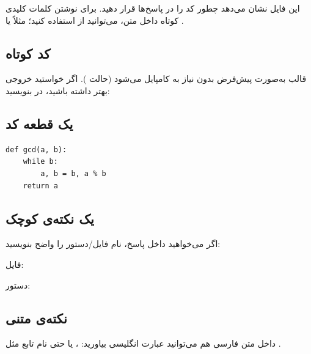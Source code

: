 
این فایل نشان می‌دهد چطور کد را در پاسخ‌ها قرار دهید.
برای نوشتن کلمات کلیدی کوتاه داخل متن، می‌توانید از  استفاده کنید؛ مثلاً  یا .

\subsection{کد کوتاه}
قالب به‌صورت پیش‌فرض بدون نیاز به  کامپایل می‌شود (حالت ).
اگر خواستید خروجی بهتر  داشته باشید، در  بنویسید:

\subsection{یک قطعه کد}
\begin{listing}[H]
	\begin{latin}
		\begin{verbatim}
def gcd(a, b):
    while b:
        a, b = b, a % b
    return a
		\end{verbatim}
	\end{latin}
	\caption{نمونه‌ی کد (Python)}
\end{listing}

\subsection{یک نکته‌ی کوچک}
اگر می‌خواهید داخل پاسخ، نام فایل/دستور را واضح بنویسید:
\begin{ابجد}
	\item فایل: 
	\item دستور: 
\end{ابجد}

\subsection{نکته‌ی متنی}
داخل متن فارسی هم می‌توانید عبارت انگلیسی بیاورید: ، یا حتی نام تابع مثل .

